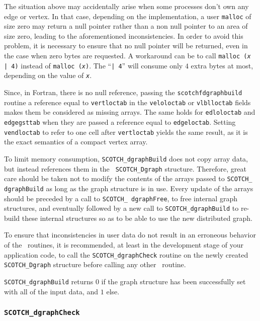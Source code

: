 \begin{itemize}
The situation above may accidentally arise when some processes don't
own any edge or vertex. In that case, depending on the implementation,
a user \texttt{malloc} of size zero may return a null pointer rather
than a non null pointer to an area of size zero, leading to the
aforementioned inconsistencies. In order to avoid this problem, it is
necessary to ensure that no null pointer will be returned, even in the
case when zero bytes are requested. A workaround can be to call
\texttt{malloc (\textit{x} | 4)} instead of \texttt{malloc
(\textit{x})}. The ``\texttt{| 4}'' will consume only $4$ extra bytes
at most, depending on the value of \texttt{\textit{x}}.

Since, in Fortran, there is no null reference, passing the
{\tt scotchf\lbt dgraph\lbt build} routine a reference equal to
{\tt vertloctab} in the {\tt veloloctab} or {\tt vlblloctab} fields
makes them be considered as missing arrays. The same holds for
{\tt edloloctab} and {\tt edgegsttab} when they are passed a
reference equal to {\tt edgeloctab}. Setting {\tt vendloctab}
to refer to one cell after {\tt vertloctab} yields the same result,
as it is the exact semantics of a compact vertex array.

To limit memory consumption, {\tt SCOTCH\_\lbt dgraph\lbo Build} does
not copy array data, but instead references them in the {\tt
SCOTCH\_\lbt Dgraph} structure. Therefore, great care should be taken
not to modify the contents of the arrays passed to {\tt SCOTCH\_\lbt
dgraph\lbo Build} as long as the graph structure is in use. Every
update of the arrays should be preceded by a call to {\tt SCOTCH\_\lbt
dgraph\lbo Free}, to free internal graph structures, and eventually
followed by a new call to {\tt SCOTCH\_\lbt dgraph\lbo Build} to
re-build these internal structures so as to be able to use the new
distributed graph.

To ensure that inconsistencies in user data do not result in an
erroneous behavior of the \libscotch\ routines, it is recommended, at
least in the development stage of your application code, to call the
{\tt SCOTCH\_\lbt dgraph\lbt Check} routine on the newly created
{\tt SCOTCH\_\lbt Dgraph} structure before calling any other
\libscotch\ routine.

\progret

{\tt SCOTCH\_dgraphBuild} returns $0$ if the graph structure has been
successfully set with all of the input data, and $1$ else.
\end{itemize}

\subsubsection{{\tt SCOTCH\_dgraphCheck}}

